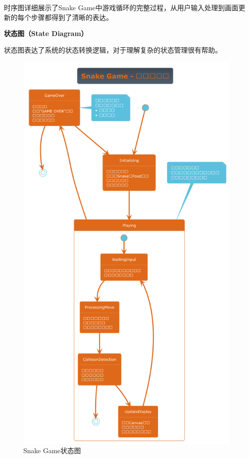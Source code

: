 \documentclass[a4paper]{article}
\begin{document}
时序图详细展示了Snake Game中游戏循环的完整过程，从用户输入处理到画面更新的每个步骤都得到了清晰的表达。

\textbf{状态图（State Diagram）}

状态图表达了系统的状态转换逻辑，对于理解复杂的状态管理很有帮助。

\begin{figure}[H]
\centering
\includegraphics[width=\textwidth]{img/Snake_Game_State.png}
\caption{Snake Game状态图}
\label{fig:snake_state}
\end{figure}
\end{document}
